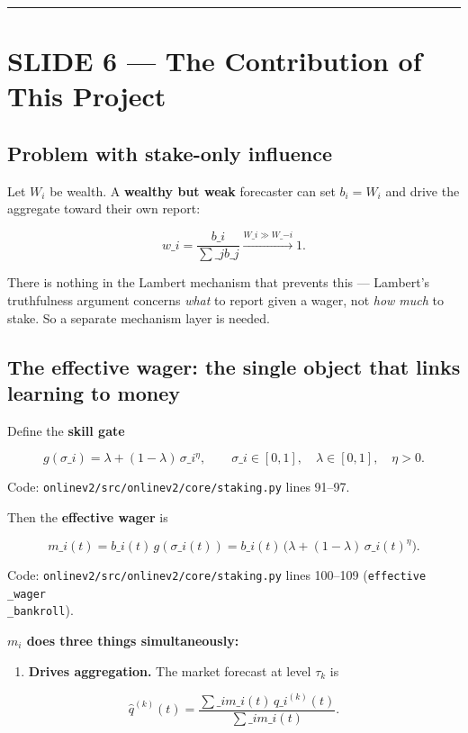 \documentclass[11pt]{article}
\begin{document}
\bigskip\hrule\bigskip

\section{SLIDE 6 --- The Contribution of This Project}


\subsection{Problem with stake-only influence}


Let $W_i$ be wealth. A \textbf{wealthy but weak} forecaster can set $b_i = W_i$ and drive the aggregate toward their own report:

$$
w\_i = \frac{b\_i}{\sum\_j b\_j} \xrightarrow{W\_i \gg W\_{-i}} 1.
$$

There is nothing in the Lambert mechanism that prevents this --- Lambert's truthfulness argument concerns \emph{what} to report given a wager, not \emph{how much} to stake. So a separate mechanism layer is needed.

\subsection{The effective wager: the single object that links learning to money}


Define the \textbf{skill gate}

$$
g(\sigma\_i) = \lambda + (1 - \lambda)\, \sigma\_i^{\eta}, \qquad \sigma\_i \in [0,1],\quad \lambda \in [0,1],\quad \eta > 0.
$$

Code: \texttt{onlinev2/src/onlinev2/core/staking.py} lines 91--97.

Then the \textbf{effective wager} is

$$
m\_i(t) = b\_i(t)\, g(\sigma\_i(t)) = b\_i(t)\,\bigl( \lambda + (1-\lambda)\,\sigma\_i(t)^{\eta} \bigr).
$$

Code: \texttt{onlinev2/src/onlinev2/core/staking.py} lines 100--109 (\texttt{effective\\_wager\\_bankroll}).

\textbf{$m_i$ does three things simultaneously:}

\begin{enumerate}
\item \textbf{Drives aggregation.} The market forecast at level $\tau_k$ is
\end{enumerate}

$$
\hat q^{(k)}(t) = \frac{\sum\_i m\_i(t)\, q\_i^{(k)}(t)}{\sum\_i m\_i(t)}.
$$
\end{document}
